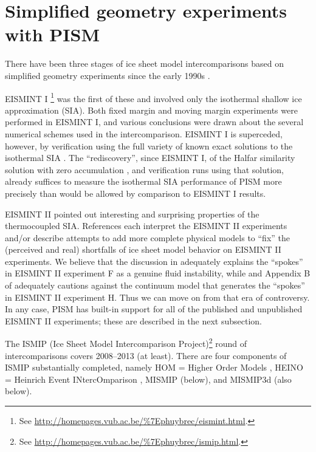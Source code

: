
\section{Simplified geometry experiments with PISM}\label{sec:simp}

There have been three stages of ice sheet model intercomparisons based on simplified geometry experiments since the early 1990s \cite{BuelerSpray}.

EISMINT I \cite[ European Ice Sheet Modeling INiTiative]{EISMINT96}\footnote{See \url{http://homepages.vub.ac.be/\%7Ephuybrec/eismint.html}.} was the first of these and involved only the isothermal shallow ice approximation (SIA).  Both fixed margin and moving margin experiments were performed in EISMINT I, and various conclusions were drawn about the several numerical schemes used in the intercomparison.  EISMINT I is superceded, however, by verification using the full variety of known exact solutions to the isothermal SIA \cite{BLKCB}.  The ``rediscovery'', since EISMINT I, of the Halfar similarity solution with zero accumulation \cite{Halfar83}, and verification runs using that solution, already suffices to measure the isothermal SIA performance of PISM more precisely than would be allowed by comparison to EISMINT I results.

EISMINT II \cite{EISMINT00} pointed out interesting and surprising properties of the thermocoupled SIA.  References \cite{BBL,Hindmarsh04,Hindmarsh06,PayneBaldwin,SaitoEISMINT,BBssasliding} each interpret the EISMINT II experiments and/or describe attempts to add more complete physical models to ``fix'' the (perceived and real) shortfalls of ice sheet model behavior on EISMINT II experiments.  We believe that the discussion in \cite{PayneDongelmans,PayneBaldwin,BBL} adequately explains the ``spokes'' in EISMINT II experiment F as a genuine fluid instability, while \cite{Fowler01} and Appendix B of \cite{BBssasliding} adequately cautions against the continuum model that generates the ``spokes'' in EISMINT II experiment H.   Thus we can move on from that era of controversy.  In any case, PISM has built-in support for all of the published and unpublished EISMINT II experiments; these are described in the next subsection.

The ISMIP (Ice Sheet Model Intercomparison Project)\footnote{See \url{http://homepages.vub.ac.be/\%7Ephuybrec/ismip.html}.} round of intercomparisons covers 2008--2013 (at least).  There are four components of ISMIP substantially completed, namely HOM = Higher Order Models \cite{ISMIPHOM,HOMelmer}, HEINO = Heinrich Event INtercOmparison \cite{GreveTakahamaCalov,Calovetal2009HEINOfinal}, MISMIP (below), and MISMIP3d (also below).

